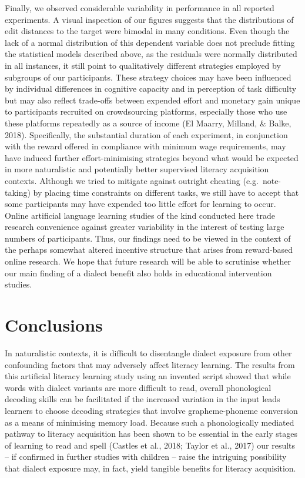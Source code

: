 \documentclass[doc,floatsintext]{apa6}
\begin{document}
Finally, we observed considerable variability in performance in all
reported experiments. A visual inspection of our figures suggests that
the distributions of edit distances to the target were bimodal in many
conditions. Even though the lack of a normal distribution of this
dependent variable does not preclude fitting the statistical models
described above, as the residuals were normally distributed in all
instances, it still point to qualitatively different strategies employed
by subgroups of our participants. These strategy choices may have been
influenced by individual differences in cognitive capacity and in
perception of task difficulty but may also reflect trade-offs between
expended effort and monetary gain unique to participants recruited on
crowdsourcing platforms, especially those who use these platforms
repeatedly as a source of income (El Maarry, Milland, \& Balke, 2018).
Specifically, the substantial duration of each experiment, in
conjunction with the reward offered in compliance with minimum wage
requirements, may have induced further effort-minimising strategies
beyond what would be expected in more naturalistic and potentially
better supervised literacy acquisition contexts. Although we tried to
mitigate against outright cheating (e.g.~note-taking) by placing time
constraints on different tasks, we still have to accept that some
participants may have expended too little effort for learning to occur.
Online artificial language learning studies of the kind conducted here
trade research convenience against greater variability in the interest
of testing large numbers of participants. Thus, our findings need to be
viewed in the context of the perhaps somewhat altered incentive
structure that arises from reward-based online research. We hope that
future research will be able to scrutinise whether our main finding of a
dialect benefit also holds in educational intervention studies.

\section{Conclusions}\label{conclusions}

In naturalistic contexts, it is difficult to disentangle dialect
exposure from other confounding factors that may adversely affect
literacy learning. The results from this artificial literacy learning
study using an invented script showed that while words with dialect
variants are more difficult to read, overall phonological decoding
skills can be facilitated if the increased variation in the input leads
learners to choose decoding strategies that involve grapheme-phoneme
conversion as a means of minimising memory load. Because such a
phonologically mediated pathway to literacy acquisition has been shown
to be essential in the early stages of learning to read and spell
(Castles et al., 2018; Taylor et al., 2017) our results -- if confirmed
in further studies with children -- raise the intriguing possibility
that dialect exposure may, in fact, yield tangible benefits for literacy
acquisition.
\end{document}
